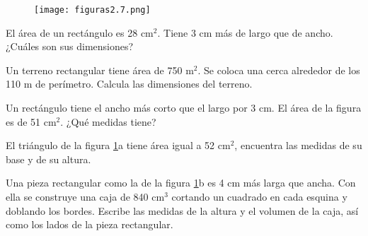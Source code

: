 \begin{enumerate}
          \begin{minipage}[t]{0.35\textwidth}
              \begin{figure}[H]
                  \centering
                  \texttt{[image: figuras2.7.png]}
                  \label{fig:figuras2.7}
              \end{figure}
          \end{minipage}\hfill
          \begin{minipage}[t]{0.5\textwidth}
              \item El área de un rectángulo es 28 cm$^2$. Tiene 3 cm más de largo que de ancho. ¿Cuáles son sus dimensiones?
              \item Un terreno rectangular tiene área de 750 m$^2$. Se coloca una cerca alrededor de los 110 m de perímetro. Calcula las dimensiones del terreno.
              \item Un rectángulo tiene el ancho más corto que el largo por 3 cm. El área de la figura es de 51 cm$^2$. ¿Qué medidas tiene?
              \item El triángulo de la figura \ref{fig:figuras2.7}a tiene área igual a 52 cm$^2$, encuentra las medidas de su base y de su altura.
              \item Una pieza rectangular como la de la figura \ref{fig:figuras2.7}b es 4 cm más larga que ancha. Con ella se construye una caja de 840 cm$^3$ cortando un cuadrado
              en cada esquina y doblando los bordes. Escribe las medidas de la altura y el volumen de la caja, así como los lados de la pieza rectangular.

          \end{minipage}

\end{enumerate}


